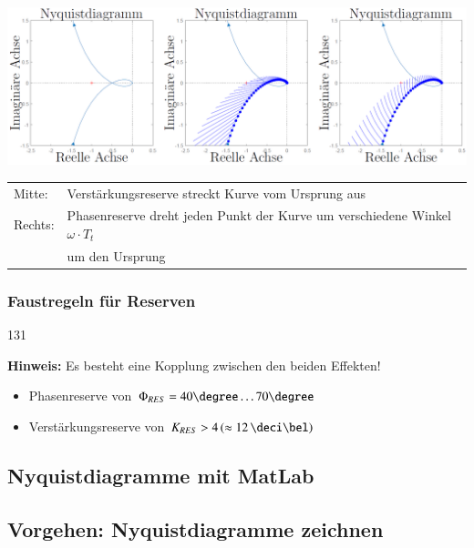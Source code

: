 
\includegraphics[width=\columnwidth]{images/nyquist_stabilitaetsreserven.png}

\begin{tabular}{ll}
    Mitte:  & Verstärkungsreserve streckt Kurve vom Ursprung aus \\
    Rechts: & Phasenreserve dreht jeden Punkt der Kurve um verschiedene Winkel $\omega \cdot T_t$ \\
            & um den Ursprung  
\end{tabular}


\subsubsection{Faustregeln für Reserven}{131}

\textbf{Hinweis:} Es besteht eine Kopplung zwischen den beiden Effekten!

\begin{itemize}
    \item Phasenreserve von $\Phi_{RES} = 40 \degree \ldots 70 \degree$
    \item Verstärkungsreserve von $K_{RES} > 4 \, (\approx 12 \, \deci \bel)$
\end{itemize}


\subsection{Nyquistdiagramme mit MatLab}



\subsection{Vorgehen: Nyquistdiagramme zeichnen}

